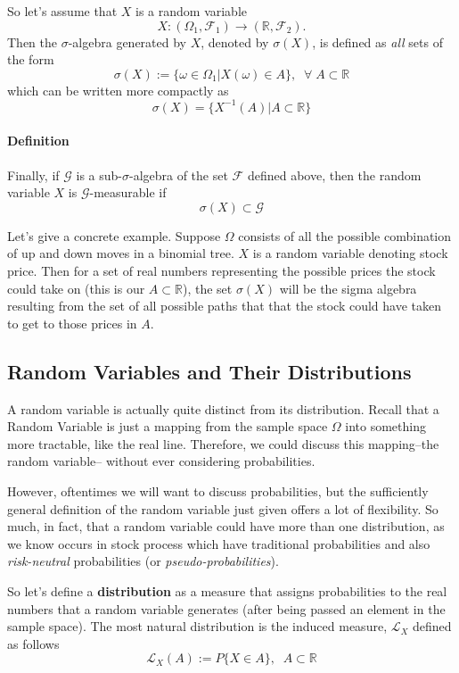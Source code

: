 \documentclass[a4paper,12pt]{article}
\theoremstyle{plain}
\theoremstyle{definition}
\theoremstyle{remark}
\begin{document}
So let's assume that $X$ is a random variable
   \[X: (\Omega_1,\mathcal{F}_1) \rightarrow
      (\mathbb{R},\mathcal{F}_2).\]
Then the $\sigma$-algebra generated by $X$, denoted by $\sigma(X)$, is
defined as \emph{all} sets of the form
   \[ \sigma(X) := \{ \omega \in \Omega_1 | X(\omega) \in A \}, \;\;
      \forall \; A \subset \mathbb{R} \]
which can be written more compactly as
   \[\sigma(X)  = \{ X^{-1}(A) | A\subset \mathbb{R}  \} \]

\paragraph{Definition} Finally, if $\mathcal{G}$ is a
sub-$\sigma$-algebra of the set $\mathcal{F}$ defined above, then the
random variable $X$ is $\mathcal{G}$-measurable if
   \[ \sigma(X) \subset \mathcal{G} \]

Let's give a concrete example.  Suppose $\Omega$ consists of all the
possible combination of up and down moves in a binomial tree.  $X$ is
a random variable denoting stock price.  Then for a set of real numbers
representing the possible prices the stock could take on (this is
our $A \subset \mathbb{R}$), the set $\sigma(X)$ will be the sigma
algebra resulting from the set of all possible paths that that the
stock could have taken to get to those prices in $A$.

\subsection{Random Variables and Their Distributions}

A random variable is actually quite distinct from its distribution.  Recall that a Random Variable is just a mapping from the
sample space $\Omega$ into something more tractable, like the real line.  Therefore, we could discuss this mapping--the random variable--
without ever considering probabilities.

However, oftentimes we will want to discuss probabilities, but the sufficiently general definition of the random variable just given
offers a lot of flexibility.  So much, in fact, that a random variable could have more than one distribution, as we know occurs in
stock process which have traditional probabilities and also \emph{risk-neutral} probabilities (or \emph{pseudo-probabilities}).

So let's define a \textbf{distribution} as a measure that assigns probabilities to the real numbers that a random variable generates
(after being passed an element in the sample space).  The most natural distribution is the induced measure, $\mathcal{L}_X$ defined
as follows
\[ \mathcal{L}_X(A) := P \{ X \in A \}, \;\; A \subset \mathbb{R} \]
\end{document}
